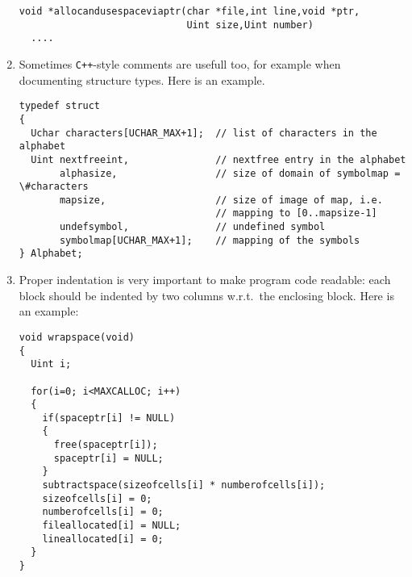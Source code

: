 \documentclass[12pt]{article}
\begin{document}
\begin{enumerate}
\begin{footnotesize}
\begin{verbatim}
void *allocandusespaceviaptr(char *file,int line,void *ptr,
                             Uint size,Uint number)
  ....
\end{verbatim}
\end{footnotesize}
\item
Sometimes \texttt{C++}-style comments are usefull too, for example
when documenting structure types. Here is an example.
\begin{footnotesize}
\begin{verbatim}
typedef struct
{
  Uchar characters[UCHAR_MAX+1];  // list of characters in the alphabet
  Uint nextfreeint,               // nextfree entry in the alphabet
       alphasize,                 // size of domain of symbolmap = \#characters
       mapsize,                   // size of image of map, i.e. 
                                  // mapping to [0..mapsize-1]
       undefsymbol,               // undefined symbol
       symbolmap[UCHAR_MAX+1];    // mapping of the symbols
} Alphabet;                       
\end{verbatim}
\end{footnotesize}
\item
Proper indentation is very important to make program code readable: each block 
should be indented by two columns w.r.t.\ the enclosing block. 
Here is an example:
\begin{footnotesize}
\begin{verbatim}
void wrapspace(void)
{
  Uint i;

  for(i=0; i<MAXCALLOC; i++)
  {
    if(spaceptr[i] != NULL)
    {
      free(spaceptr[i]);
      spaceptr[i] = NULL;
    }
    subtractspace(sizeofcells[i] * numberofcells[i]);
    sizeofcells[i] = 0;
    numberofcells[i] = 0;
    fileallocated[i] = NULL;
    lineallocated[i] = 0;
  }
}
\end{verbatim}
\end{footnotesize}
\end{enumerate}
\end{document}
